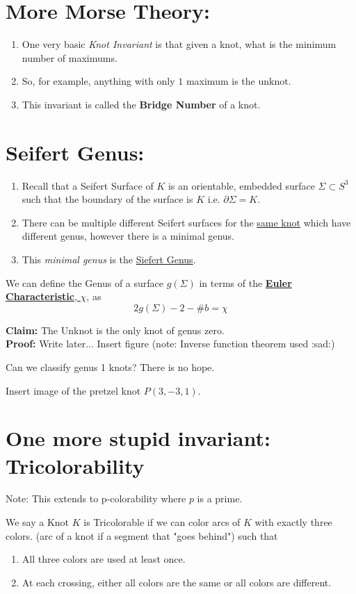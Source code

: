 \documentclass[twoside]{article}
\begin{document}
\section*{More Morse Theory:}
\begin{enumerate}
   \item One very basic \emph{Knot Invariant} is that given a knot, what is the minimum number of maximums.
   \item So, for example, anything with only $1$ maximum is the unknot.
   \item This invariant is called the \textbf{Bridge Number} of a knot.
\end{enumerate}

\section*{Seifert Genus:}
\begin{enumerate}
   \item Recall that a Seifert Surface of $K$ is an orientable, embedded surface $\Sigma \subset S^3$ such that the boundary of the surface is $K$ i.e. $\partial \Sigma = K$.
   
   \item There can be multiple different Seifert surfaces for the \underline{same knot} which have different genus, however there is a minimal genus.
   
   \item This \emph{minimal genus} is the \underline{Siefert Genus}.
\end{enumerate}
We can define the Genus of a surface $g(\Sigma)$ in terms of the \underline{\textbf{Euler Characteristic}, $\chi$}, as 
\[\boxed{ 2g(\Sigma) - 2 - \#b = \chi }\]

\textbf{Claim:} The Unknot is the only knot of genus zero.\\
\textbf{Proof:} Write later... Insert figure (note: Inverse function theorem used :sad:)

Can we classify genus 1 knots? There is no hope.

Insert image of the pretzel knot $P(3,-3,1)$.

\section*{One more stupid invariant: Tricolorability}

Note: This extends to p-colorability where $p$ is a prime.

We say a Knot $K$ is Tricolorable if we can color arcs of $K$ with exactly three colors. (arc of a knot if a segment that "goes behind") such that
\begin{enumerate}
   \item All three colors are used at least once.
   \item At each crossing, either all colors are the same or all colors are different.
\end{enumerate}
\end{document}
